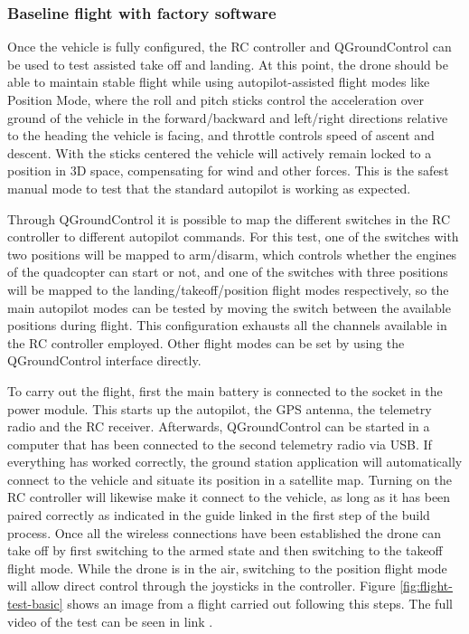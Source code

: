 \subsubsection{Baseline flight with factory software}
\label{subsec:fl-test-1}

Once the vehicle is fully configured, the RC controller and QGroundControl can be used to test assisted take off and landing.
At this point, the drone should be able to maintain stable flight while using autopilot-assisted flight modes like Position Mode, where the roll and pitch sticks control the acceleration over ground of the vehicle in the forward/backward and left/right directions relative to the heading the vehicle is facing, and throttle controls speed of ascent and descent. 
With the sticks centered the vehicle will actively remain locked to a position in 3D space, compensating for wind and other forces.
This is the safest manual mode to test that the standard autopilot is working as expected.

Through QGroundControl it is possible to map the different switches in the RC controller to different autopilot commands.
For this test, one of the switches with two positions will be mapped to arm/disarm, which controls whether the engines of the quadcopter can start or not, and one of the switches with three positions will be mapped to the landing/takeoff/position flight modes respectively, so the main autopilot modes can be tested by moving the switch between the available positions during flight.
This configuration exhausts all the channels available in the RC controller employed.
Other flight modes can be set by using the QGroundControl interface directly.

To carry out the flight, first the main battery is connected to the socket in the power module.
This starts up the autopilot, the GPS antenna, the telemetry radio and the RC receiver.
Afterwards, QGroundControl can be started in a computer that has been connected to the second telemetry radio via USB.
If everything has worked correctly, the ground station application will automatically connect to the vehicle and situate its position in a satellite map.
Turning on the RC controller will likewise make it connect to the vehicle, as long as it has been paired correctly as indicated in the guide linked in the first step of the build process.
Once all the wireless connections have been established the drone can take off by first switching to the armed state and then switching to the takeoff flight mode.
While the drone is in the air, switching to the position flight mode will allow direct control through the joysticks in the controller.
Figure \ref{fig:flight-test-basic} shows an image from a flight carried out following this steps.
The full video of the test can be seen in link .

